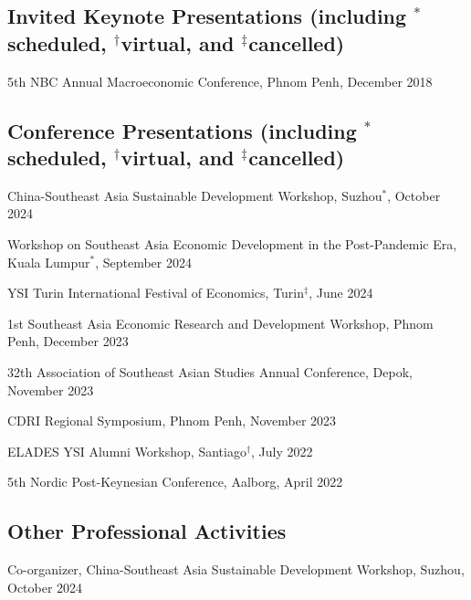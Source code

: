 \documentclass[10pt,a4paper]{article}
\begin{document}
	
\subsection*{Invited Keynote Presentations (including $^\ast$scheduled, $^\dag$virtual, and $^\ddag$cancelled)}

5th NBC Annual Macroeconomic Conference, Phnom Penh, December 2018


\subsection*{Conference Presentations (including $^\ast$scheduled, $^\dag$virtual, and $^\ddag$cancelled)}

China-Southeast Asia Sustainable Development Workshop, Suzhou$^\ast$, October 2024

Workshop on Southeast Asia Economic Development in the Post-Pandemic Era, Kuala Lumpur$^\ast$, September 2024

YSI Turin International Festival of Economics, Turin$^\ddag$, June 2024

1st Southeast Asia Economic Research and Development Workshop, Phnom Penh, December 2023

32th Association of Southeast Asian Studies Annual Conference, Depok, November 2023

CDRI Regional Symposium, Phnom Penh, November 2023

ELADES YSI Alumni Workshop, Santiago$^\dag$, July 2022

5th Nordic Post-Keynesian Conference, Aalborg, April 2022

\subsection*{Other Professional Activities}

	Co-organizer, China-Southeast Asia Sustainable Development Workshop, Suzhou, October 2024
\end{document}
